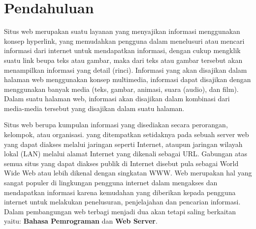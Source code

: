 \section{Pendahuluan}
	Situs web merupakan suatu layanan yang menyajikan informasi menggunakan konsep hyperlink, yang memudahkan pengguna dalam menelusuri atau mencari informasi dari internet untuk mendapatkan informasi, dengan cukup mengklik suatu link beupa teks atau gambar, maka dari teks atau gambar tersebut akan menampilkan informasi yang detail (rinci).
Informasi yang akan disajikan dalam halaman web menggunakan konsep multimedia, informasi dapat disajikan dengan menggunakan banyak media (teks, gambar, animasi, suara (audio), dan film). Dalam suatu halaman web, informasi akan disajikan dalam kombinasi dari media-media tersebut yang disajikan dalam suatu halaman.

	Situs web berupa kumpulan informasi yang disediakan secara perorangan, kelompok, atau organisasi. yang ditempatkan setidaknya pada sebuah server web yang dapat diakses melalui jaringan seperti Internet, ataupun jaringan wilayah lokal (LAN) melalui alamat Internet yang dikenali sebagai URL. Gabungan atas semua situs yang dapat diakses publik di Internet disebut pula sebagai World Wide Web atau lebih dikenal dengan singkatan WWW. Web merupakan hal yang sangat populer di lingkungan pengguna internet dalam mengakses dan mendapatkan informasi karena kemudahan yang diberikan kepada pengguna internet untuk melakukan penelusuran, penjelajahan dan pencarian informasi. Dalam pembangungan web terbagi menjadi dua akan tetapi saling berkaitan yaitu: \textbf{Bahasa Pemrograman} dan \textbf{Web Server}.

